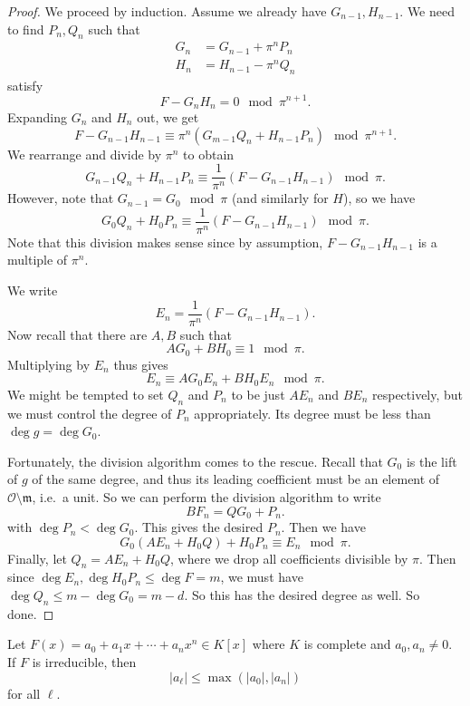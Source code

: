 \documentclass[a4paper]{article}
\begin{document}
\begin{proof}
  We proceed by induction. Assume we already have $G_{n - 1}, H_{n - 1}$. We need to find $P_n, Q_n$ such that
  \begin{align*}
    G_n &= G_{n - 1} + \pi^n P_n\\
    H_n &= H_{n - 1} - \pi^n Q_n
  \end{align*}
  satisfy
  \[
    F - G_n H_n = 0\mod \pi^{n + 1}.
  \]
  Expanding $G_n$ and $H_n$ out, we get
  \[
    F - G_{n - 1}H_{n - 1} \equiv \pi^n (G_{m - 1} Q_n + H_{n - 1} P_n) \mod \pi^{n + 1}.
  \]
  We rearrange and divide by $\pi^n$ to obtain
  \[
    G_{n - 1} Q_n + H_{n - 1} P_n \equiv \frac{1}{\pi^n}(F - G_{n - 1}H_{n - 1}) \mod \pi.
  \]
  However, note that $G_{n - 1} = G_0 \mod \pi$ (and similarly for $H$), so we have
  \[
    G_0 Q_n + H_0 P_n \equiv \frac{1}{\pi^n}(F - G_{n - 1}H_{n - 1}) \mod \pi.
  \]
  Note that this division makes sense since by assumption, $F - G_{n - 1}H_{n - 1}$ is a multiple of $\pi^n$.

  We write
  \[
    E_n = \frac{1}{\pi^n}(F - G_{n - 1}H_{n - 1}).
  \]
  Now recall that there are $A, B$ such that
  \[
    AG_0 + B H_0 \equiv 1\mod \pi.
  \]
  Multiplying by $E_n$ thus gives
  \[
    E_n \equiv AG_0 E_n + B H_0 E_n\mod \pi.
  \]
  We might be tempted to set $Q_n$ and $P_n$ to be just $AE_n$ and $BE_n$ respectively, but we must control the degree of $P_n$ appropriately. Its degree must be less than $\deg g = \deg G_0$.

  Fortunately, the division algorithm comes to the rescue. Recall that $G_0$ is the lift of $g$ of the same degree, and thus its leading coefficient must be an element of $\mathcal{O} \setminus \mathfrak{m}$, i.e.\ a unit. So we can perform the division algorithm to write
  \[
    B F_n = Q G_0 + P_n.
  \]
  with $\deg P_n < \deg G_0$. This gives the desired $P_n$. Then we have
  \[
    G_0 (A E_n + H_0 Q) + H_0 P_n \equiv E_n \mod \pi.
  \]
  Finally, let $Q_n = A E_n + H_0 Q$, where we drop all coefficients divisible by $\pi$. Then since $\deg E_n, \deg H_0 P_n \leq \deg F = m$, we must have $\deg Q_n \leq m - \deg G_0 = m - d$. So this has the desired degree as well. So done.
\end{proof}

\begin{cor}
  Let $F(x) = a_0 + a_1 x + \cdots + a_n x^n \in K[x]$ where $K$ is complete and $a_0, a_n \not= 0$. If $F$ is irreducible, then
  \[
    |a_\ell| \leq \max(|a_0|, |a_n|)
  \]
  for all $\ell$.
\end{cor}
\end{document}
